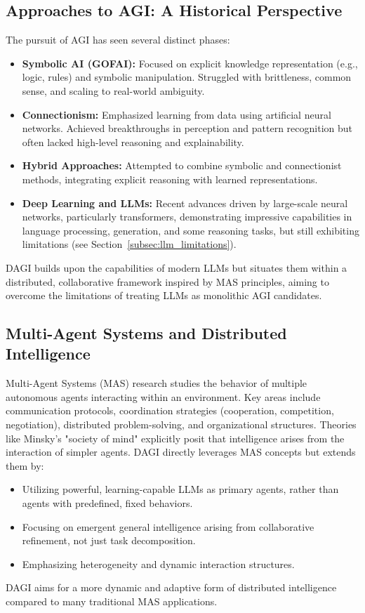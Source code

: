\documentclass[12pt]{amsart}
\begin{document}
\subsection{Approaches to AGI: A Historical Perspective}
The pursuit of AGI has seen several distinct phases:
\begin{itemize}[leftmargin=*]
    \item \textbf{Symbolic AI (GOFAI):} Focused on explicit knowledge representation (e.g., logic, rules) and symbolic manipulation. Struggled with brittleness, common sense, and scaling to real-world ambiguity.
    \item \textbf{Connectionism:} Emphasized learning from data using artificial neural networks. Achieved breakthroughs in perception and pattern recognition but often lacked high-level reasoning and explainability.
    \item \textbf{Hybrid Approaches:} Attempted to combine symbolic and connectionist methods, integrating explicit reasoning with learned representations.
    \item \textbf{Deep Learning and LLMs:} Recent advances driven by large-scale neural networks, particularly transformers, demonstrating impressive capabilities in language processing, generation, and some reasoning tasks, but still exhibiting limitations (see Section~\ref{subsec:llm_limitations}).
\end{itemize}
DAGI builds upon the capabilities of modern LLMs but situates them within a distributed, collaborative framework inspired by MAS principles, aiming to overcome the limitations of treating LLMs as monolithic AGI candidates.

\subsection{Multi-Agent Systems and Distributed Intelligence}
Multi-Agent Systems (MAS) research studies the behavior of multiple autonomous agents interacting within an environment. Key areas include communication protocols, coordination strategies (cooperation, competition, negotiation), distributed problem-solving, and organizational structures. Theories like Minsky's "society of mind" explicitly posit that intelligence arises from the interaction of simpler agents. DAGI directly leverages MAS concepts but extends them by:
\begin{itemize}[leftmargin=*]
    \item Utilizing powerful, learning-capable LLMs as primary agents, rather than agents with predefined, fixed behaviors.
    \item Focusing on emergent general intelligence arising from collaborative refinement, not just task decomposition.
    \item Emphasizing heterogeneity and dynamic interaction structures.
\end{itemize}
DAGI aims for a more dynamic and adaptive form of distributed intelligence compared to many traditional MAS applications.
\end{document}

